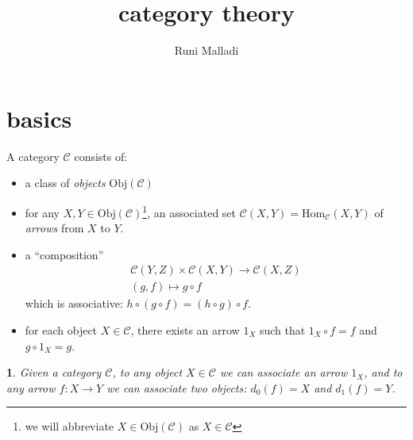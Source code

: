\documentclass[12pt]{article}
\title{category theory}
\author{Runi Malladi}
\newtheorem{para}[theorem]{}
\begin{document}
\maketitle

\section{basics} %

\begin{definition}
	A category $\mathcal{C}$ consists of: 
	\begin{itemize}
		\item a class of \emph{objects} $\text{Obj}(\mathcal{C})$
		\item for any $X,Y\in\text{Obj}(\mathcal{C})$\footnote{we will abbreviate $X\in\text{Obj}(\mathcal{C})$ as $X\in\mathcal{C}$}, an associated set $\mathcal{C}(X,Y)=\text{Hom}_\mathcal{C}(X,Y)$ of \emph{arrows} from $X$ to $Y$.
		\item a ``composition'' 
			\begin{gather*}
				\mathcal{C}(Y,Z) \times \mathcal{C}(X,Y) \to \mathcal{C}(X,Z) \\
				(g,f) \mapsto g\circ f
			\end{gather*}
			which is associative: $h\circ(g\circ f) = (h\circ g)\circ f$. 
		\item for each object $X\in\mathcal{C}$, there exists an arrow $1_X$ such that $1_X\circ f = f$ and $g\circ 1_X = g$. 
	\end{itemize}
\end{definition}

\begin{para}
	Given a category $\mathcal{C}$, to any object $X\in\mathcal{C}$ we can associate an arrow $1_X$, and to any arrow $f:X\to Y$ we can associate two objects: $d_0(f)=X$ and $d_1(f)=Y$.
\end{para}
\end{document}
